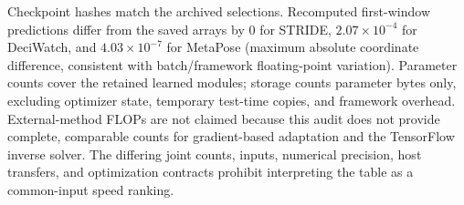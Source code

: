 \documentclass[11pt,letterpaper]{article}
\begin{document}
Checkpoint hashes match the archived selections. Recomputed first-window predictions differ from the saved arrays by 0 for STRIDE, $2.07\times10^{-4}$ for DeciWatch, and $4.03\times10^{-7}$ for MetaPose (maximum absolute coordinate difference, consistent with batch/framework floating-point variation). Parameter counts cover the retained learned modules; storage counts parameter bytes only, excluding optimizer state, temporary test-time copies, and framework overhead. External-method FLOPs are not claimed because this audit does not provide complete, comparable counts for gradient-based adaptation and the TensorFlow inverse solver. The differing joint counts, inputs, numerical precision, host transfers, and optimization contracts prohibit interpreting the table as a common-input speed ranking.



\end{document}
